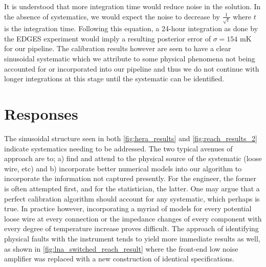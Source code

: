 It is understood that more integration time would reduce noise in the solution. In the absence of systematics, we would expect the noise to decrease by $\frac{1}{\sqrt{t}}$ where $t$ is the integration time. Following this equation, a 24-hour integration as done by the EDGES experiment would imply a resulting posterior error of $\sigma = 154$ mK for our pipeline. The calibration results however are seen to have a clear sinusoidal systematic which we attribute to some physical phenomena not being accounted for or incorporated into our pipeline and thus we do not continue with longer integrations at this stage until the systematic can be identified.

\section{Responses}\label{sec:responses}
The sinusoidal structure seen in both \cref{fig:hera_results} and \cref{fig:reach_results_2} indicate systematics needing to be addressed. The two typical avenues of approach are to; a) find and attend to the physical source of the systematic (loose wire, etc) and b) incorporate better numerical models into our algorithm to incorporate the information not captured presently. For the engineer, the former is often attempted first, and for the statistician, the latter. One may argue that a perfect calibration algorithm should account for any systematic, which perhaps is true. In practice however, incorporating a myriad of models for every potential loose wire at every connection or the impedance changes of every component with every degree of temperature increase proves difficult. The approach of identifying physical faults with the instrument tends to yield more immediate results as well, as shown in \cref{fig:lna_switched_reach_result} where the front-end low noise amplifier was replaced with a new construction of identical specifications.
